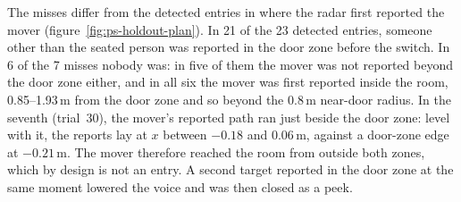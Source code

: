 The misses differ from the detected entries in where the radar first reported
the mover (figure~\ref{fig:ps-holdout-plan}). In 21 of the 23 detected
entries, someone other than the seated person was reported in the door zone
before the switch. In 6 of the 7 misses nobody was: in five of them the mover
was not reported beyond the door zone either, and in all six the mover was
first reported inside the room, 0.85--1.93\,m from the door zone and so beyond
the 0.8\,m near-door radius. In the seventh (trial~30), the mover's reported
path ran just beside the door zone: level with it, the reports lay at $x$
between $-0.18$ and 0.06\,m, against a door-zone edge at $-0.21$\,m. The
mover therefore reached the room from outside both zones, which by design is
not an entry. A second target reported in the door zone at the same moment
lowered the voice and was then closed as a peek.

